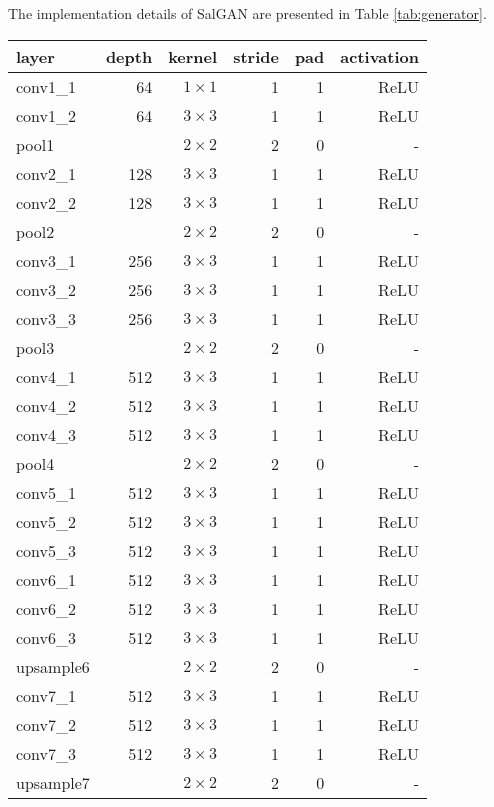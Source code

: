 \documentclass[times,twocolumn,final,authoryear]{elsarticle}
\begin{document}
The implementation details of SalGAN are presented in Table \ref{tab:generator}.

\begin{table}
\centering
\footnotesize
\begin{tabular}{lrrrrr}
\hline
layer & depth & kernel & stride & pad & activation \\
\hline
conv1\_1 & 64& $ 1 \times 1 $ & 1 & 1 & ReLU \\
conv1\_2 & 64 & $ 3 \times 3 $ & 1 & 1 & ReLU \\
\hline
pool1 &  & $ 2 \times 2 $ & 2 & 0 & - \\
\hline
conv2\_1 & 128 & $ 3 \times 3 $ & 1 & 1 & ReLU \\
conv2\_2 & 128& $ 3 \times 3 $ & 1 & 1 & ReLU \\
\hline
pool2 &  & $ 2 \times 2 $ & 2 & 0 & - \\
\hline
conv3\_1 & 256 & $ 3 \times 3 $ & 1 & 1 & ReLU \\
conv3\_2 & 256 & $ 3 \times 3 $ & 1 & 1 & ReLU \\
conv3\_3 & 256 & $ 3 \times 3 $ & 1 & 1 & ReLU \\
\hline
pool3 &  & $ 2 \times 2 $ & 2 & 0 & - \\
\hline
conv4\_1 & 512 & $ 3 \times 3 $ & 1 & 1 & ReLU \\
conv4\_2 & 512 & $ 3 \times 3 $ & 1 & 1 & ReLU \\
conv4\_3 & 512 & $ 3 \times 3 $ & 1 & 1 & ReLU \\
\hline
pool4 &  & $ 2 \times 2 $ & 2 & 0 & - \\
\hline
conv5\_1 & 512 & $ 3 \times 3 $ & 1 & 1 & ReLU \\
conv5\_2 & 512 & $ 3 \times 3 $ & 1 & 1 & ReLU \\
conv5\_3 & 512 & $ 3 \times 3 $ & 1 & 1 & ReLU \\
\hline
conv6\_1 & 512 & $ 3 \times 3 $ & 1 & 1 & ReLU \\
conv6\_2 & 512 & $ 3 \times 3 $ & 1 & 1 & ReLU \\
conv6\_3 & 512 & $ 3 \times 3 $ & 1 & 1 & ReLU \\
\hline
upsample6 &  & $ 2 \times 2 $ & 2 & 0 & - \\
\hline
conv7\_1 & 512 & $ 3 \times 3 $ & 1 & 1 & ReLU \\
conv7\_2 & 512 & $ 3 \times 3 $ & 1 & 1 & ReLU \\
conv7\_3 & 512 & $ 3 \times 3 $ & 1 & 1 & ReLU \\
\hline
upsample7 &  & $ 2 \times 2 $ & 2 & 0 & - \\

\end{tabular}
\end{table}
\end{document}
